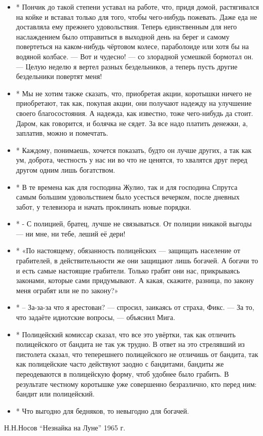 \begin{itemize}

\item * 
Пончик до такой степени уставал на работе, что, придя домой, растягивался на койке и вставал только для того, чтобы чего-нибудь пожевать. Даже еда не доставляла ему прежнего удовольствия. Теперь единственным для него наслаждением было отправиться в выходной день на берег и самому повертеться на каком-нибудь чёртовом колесе, параболоиде или хотя бы на водяной колбасе. --- Вот и чудесно! --- со злорадной усмешкой бормотал он. --- Целую неделю я вертел разных бездельников, а теперь пусть другие бездельники повертят меня! 
\item *
Мы не хотим также сказать, что, приобретая акции, коротышки ничего не приобретают, так как, покупая акции, они получают надежду на улучшение своего благосостояния. А надежда, как известно, тоже чего-нибудь да стоит. Даром, как говорится, и болячка не сядет. За все надо платить денежки, а, заплатив, можно и помечтать. 
\item *
Каждому, понимаешь, хочется показать, будто он лучше других, а так как ум, доброта, честность у нас ни во что не ценятся, то хвалятся друг перед другом одним лишь богатством. 
\item *
В те времена как для господина Жулио, так и для господина Спрутса самым большим удовольствием было усесться вечерком, после дневных забот, у телевизора и начать проклинать новые порядки. 
\item *
- С полицией, братец, лучше не связываться. От полиции никакой выгоды --- ни мне, ни тебе, леший её дери! 
\item *
«По настоящему, обязанность полицейских --- защищать население от грабителей, в действительности же они защищают лишь богачей. А богачи то и есть самые настоящие грабители. Только грабят они нас, прикрываясь законами, которые сами придумывают. А какая, скажите, разница, по закону меня ограбят или не по закону?» 
\item *
– За-за-за что я арестован? --- спросил, заикаясь от страха, Фикс. --- За то, что задаёте идиотские вопросы, --- объяснил Мига. 
\item *
Полицейский комиссар сказал, что все это увёртки, так как отличить полицейского
от бандита не так уж трудно. В ответ на это стрелявший из
пистолета сказал, что теперешнего полицейского не отличишь от
бандита, так как полицейские часто действуют заодно с
бандитами, бандиты же переодеваются в полицейскую форму, чтоб
удобнее было грабить. В результате честному коротышке уже
совершенно безразлично, кто перед ним: бандит или полицейский. 

\item *
Что выгодно для бедняков, то невыгодно для богачей. 
\end{itemize}

Н.Н.Носов \enquote{Незнайка на Луне} 1965 г.
